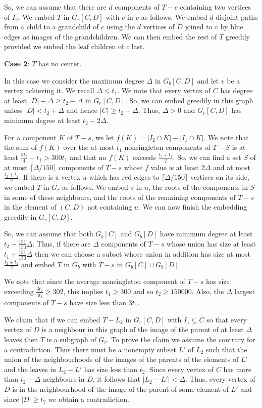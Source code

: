 \documentclass[11pt]{article}
\begin{document}
So, we can assume that there are $d$ components of $T-c$ containing two vertices of $I_2$.  We  embed $T$ in $G_r[C,D]$ with $c$ in $v$ as follows. 
We embed $d$ disjoint paths from   a child to a grandchild of $c$ using the $d$ vertices of $D$ joined to $v$ by blue edges 
as images of the grandchildren. We can then embed the rest of $T$ greedily provided we embed the leaf children of $c$  last. 

{\bf Case 2}: $T$ has no center. 

In this case we consider the maximum degree $\Delta$ in $G_b[C,D]$ and let $v$ be a vertex achieving it. 
We recall $\Delta \le t_1$. 
We note that every vertex of $C$ has degree at least $|D|-\Delta \ge t_2-\Delta$ 
in $G_r[C,D]$. So, we can embed greedily in this graph unless $|D| < t_2+\Delta$ and hence $|C| \ge t_2-\Delta$. 
Thus, $\Delta>0$ and $G_r[C,D]$ has minimum degree at least $t_2-2\Delta$. 

 For a component $K$ of $T-s$, we let  $f(K)=|I_2 \cap K|-|I_1 \cap K|$.
 We note that the sum of $f(K)$ over the at most $t_1$  nonsingleton components of $T-S$ is at least $\frac{3t_2}{4}-t_1 >300t_1$
 and that no $f(K)$ exceeds $\frac{t_2+t_1}{2}$. So, we can find a set $S$  of  at most $\lceil\Delta/150\rceil$ components 
 of $T-s$ whose $f$ value is at least $2\Delta$ and at most $\frac{t_2+t_1}{2}$. If   there is a vertex $u$  which has red edges 
 to $\lceil\Delta/150\rceil$ vertices on its side, we embed $T$ in $G_r$ as follows. We embed  $s$ in $u$, the roots of the components in $S$ in some of these neighbours, and the roots of the remaining components of $T-s$ in the element of $(C,D)$ not containing $u$. We can now finish the embedding greedily in $G_r[C,D]$.

 So, we can assume that both $G_b[C]$ and $G_b[D]$ have minimum degree at least $t_2-\tfrac{151}{150}\Delta$.
 Thus, if there are $\Delta$ components of $T-s$ whose union has size at least $t_1+\tfrac{151}{150} \Delta$ then we can
 choose a subset whose union in addition has  size at most $\frac{t_2+t_1}{2}$ and 
 embed $T$ in  $G_b$ with $T-s$ in $G_b[C] \cup G_b[D]$. 

We note that since the average nonsingleton component of $T-s$ has size exceeding $\frac{3t_2}{4t_1} \ge 302$, this implies $t_1 \ge 300$
and so $t_2 \ge 150000$. Also, the $\Delta$ largest components of $T-s$ have size less than $3t_1$. 

We claim that if  we can embed $T-L_2$ in $G_r[C,D]$ with $I_1 \subseteq C$ so that every vertex of $D$ is a neighbour in this 
graph of the image of the parent of at least $\Delta$ leaves then $T$ is a subgraph of $G_r$.  To prove the claim we assume the contrary for a contradiction. Thus there must be a nonempty subset $L'$ of $L_2$ such that the union of the neighbourhoods of the images of the parents of the elements of $L'$ 
and the leaves in $L_2-L'$ has size less than   $t_2$.  Since every vertex of $C$ has more than $t_2-\Delta$ neighbours in 
$D$, it follows that $|L_2-L'|<\Delta$. Thus, every vertex of $D$ is in the neighbourhood of the image of the parent of  some element of $L'$ and since $|D| \ge t_2$ 
we obtain a contradiction. 
\end{document}
